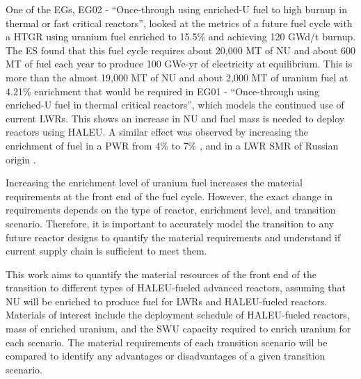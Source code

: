 One of the \glspl{EG}, \gls{EG}02 - ``Once-through using enriched-U fuel to 
high burnup in thermal or fast critical reactors'', looked at the metrics 
of a future fuel cycle with a \gls{HTGR} using uranium fuel enriched to 
15.5\% and achieving 120 GWd/t burnup. The \gls{ES} found that this fuel cycle
requires about 20,000 MT of \gls{NU} and about 600 MT of fuel each year 
to produce 100 GWe-yr of electricity at equilibrium. This is more than the 
almost 19,000 MT of \gls{NU} and about 2,000 MT of uranium fuel at 4.21\%
enrichment that would be required in \gls{EG}01 - ``Once-through using enriched-U 
fuel in thermal critical reactors'', which models the continued use of current 
\glspl{LWR}. This shows an increase in \gls{NU} and fuel mass is needed to 
deploy reactors using \gls{HALEU}.
A similar effect was observed by increasing the enrichment of fuel in a 
\gls{PWR} from 4\% to 7\% \cite{burns_reactor_2020}, and in a \gls{LWR}
\gls{SMR} of Russian origin \cite{hernandez_potential_2020}. 

Increasing the enrichment level of uranium fuel 
increases the material requirements at the front end of 
the fuel cycle. However, the exact change in requirements depends 
on the type of reactor, enrichment level, and transition scenario.
Therefore, it is important to accurately model the transition to any future
reactor designs to quantify the material requirements and understand
if current supply chain is sufficient to meet them. 

This work aims to quantify the material resources of the front end of the 
transition to different types of \gls{HALEU}-fueled advanced reactors, 
assuming that \gls{NU} will be enriched to produce fuel for \glspl{LWR} and 
\gls{HALEU}-fueled reactors. 
Materials of interest include the deployment schedule of \gls{HALEU}-fueled 
reactors, mass of enriched uranium, and the \gls{SWU} capacity required to 
enrich uranium for each scenario. The material requirements of each transition 
scenario will be compared to identify any advantages or disadvantages of 
a given transition scenario. 
